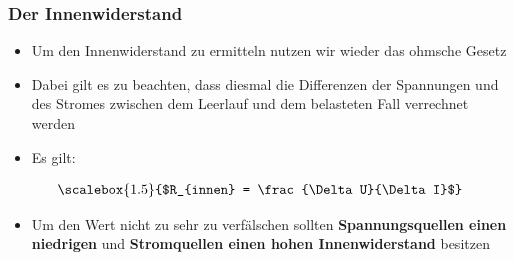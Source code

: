 \begin{frame}
  \frametitle{Der Innenwiderstand}
  \begin{itemize}
    \item Um den Innenwiderstand zu ermitteln nutzen wir wieder das ohmsche Gesetz
    \item Dabei gilt es zu beachten, dass diesmal die Differenzen der Spannungen und des Stromes zwischen dem Leerlauf und dem belasteten Fall verrechnet werden
    \item Es gilt:
  \end{itemize}
  \begin{align}
    	\scalebox{1.5}{$R_{innen} = \frac{\Delta U}{\Delta I}$}
  \end{align}
  \begin{itemize}
    \item Um den Wert nicht zu sehr zu verfälschen sollten \textbf{Spannungsquellen einen niedrigen} und \textbf{Stromquellen einen hohen Innenwiderstand} besitzen
  \end{itemize}
\end{frame}


